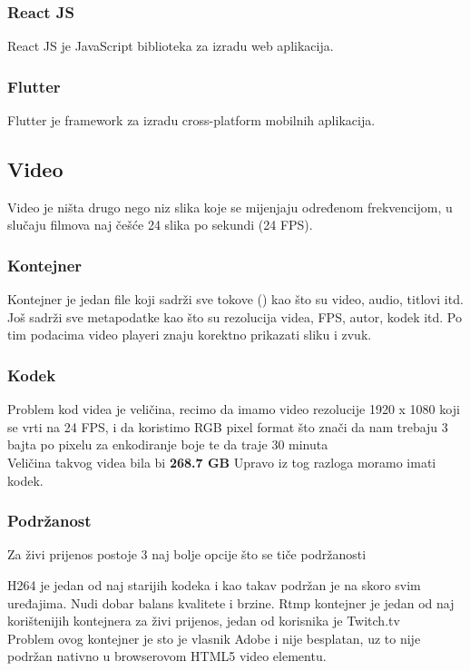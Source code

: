 \subsubsection{React JS}
React JS je  JavaScript biblioteka za izradu web aplikacija.
\paraBreak


\subsubsection{Flutter}
Flutter je  framework za izradu cross-platform mobilnih aplikacija.

\clearpage
\subsection{Video}
Video je ništa drugo nego niz slika koje se mijenjaju određenom frekvencijom, u slučaju filmova naj češće 24 slika po sekundi (24 FPS).

\subsubsection{Kontejner}
Kontejner je jedan file koji sadrži sve tokove () kao što su video, audio, titlovi itd.\\
Još sadrži sve metapodatke kao što su rezolucija videa, FPS, autor, kodek itd. Po tim podacima video playeri znaju korektno prikazati sliku i zvuk.

\subsubsection{Kodek}
Problem kod videa je veličina, recimo da imamo video rezolucije 1920 x 1080 koji se vrti na 24 FPS, i da koristimo RGB pixel format
što znači da nam trebaju 3 bajta po pixelu za enkodiranje boje te da traje 30 minuta \\
Veličina takvog videa bila bi \textbf{268.7 GB}
\paraBreak
Upravo iz tog razloga moramo imati kodek.

\subsubsection{Podržanost}
Za živi prijenos postoje 3 naj bolje opcije što se tiče podržanosti

H264 je jedan od naj starijih kodeka i kao takav podržan je na skoro svim uređajima.
Nudi dobar balans kvalitete i brzine.
\paraBreak
Rtmp kontejner je jedan od naj korištenijih kontejnera za živi prijenos, jedan od korisnika je Twitch.tv \\
Problem ovog kontejner je sto je vlasnik Adobe i nije besplatan, uz to nije podržan nativno u browserovom HTML5 video elementu.

